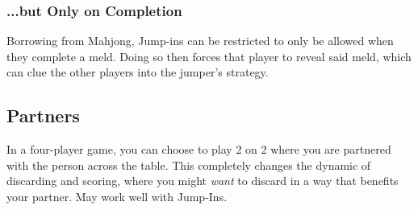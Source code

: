 \subsubsection{...but Only on Completion}
Borrowing from Mahjong, Jump-ins can be restricted to only be allowed when they complete a meld. Doing so then forces that player to reveal said meld, which can clue the other players into the jumper's strategy.

\subsection{Partners}
In a four-player game, you can choose to play 2 on 2 where you are partnered with the person across the table.
This completely changes the dynamic of discarding and scoring, where you might \textit{want} to discard in a way that benefits your partner. May work well with Jump-Ins.